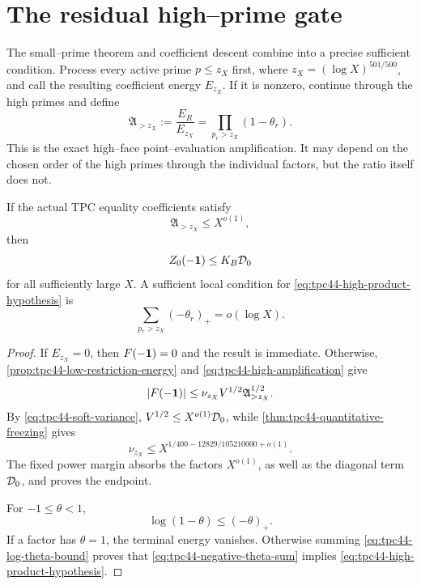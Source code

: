 \section{The residual high--prime gate}
\label{sec:tpc44-next-gate}

The small--prime theorem and coefficient descent combine into a precise
sufficient condition.  Process every active prime \(p\le z_X\) first,
where \(z_X=(\log X)^{501/500}\), and call the resulting coefficient
energy \(E_{z_X}\).  If it is nonzero, continue through the high primes
and define
\begin{equation}
 \mathfrak A_{>z_X}
 :=\frac{E_R}{E_{z_X}}
 =\prod_{p_r>z_X}(1-\theta_r).
 \label{eq:tpc44-high-amplification}
\end{equation}
This is the exact high--face point--evaluation amplification.  It may
depend on the chosen order of the high primes through the individual
factors, but the ratio itself does not.

\begin{theorem}
\label{thm:tpc44-high-gate}
If the actual TPC equality coefficients satisfy
\begin{equation}
 \mathfrak A_{>z_X}\le X^{o(1)},
 \label{eq:tpc44-high-product-hypothesis}
\end{equation}
then
\begin{equation}
 Z_0(-\mathbf 1)\le K_B\mathcal D_0
 \label{eq:tpc44-conditional-endpoint}
\end{equation}
for all sufficiently large \(X\).  A sufficient local condition for
\eqref{eq:tpc44-high-product-hypothesis} is
\begin{equation}
 \sum_{p_r>z_X}(-\theta_r)_+=o(\log X).
 \label{eq:tpc44-negative-theta-sum}
\end{equation}
\end{theorem}

\begin{proof}
If \(E_{z_X}=0\), then \(F(-\mathbf 1)=0\) and the result is immediate.
Otherwise, \cref{prop:tpc44-low-restriction-energy} and
\eqref{eq:tpc44-high-amplification} give
\begin{equation}
 |F(-\mathbf 1)|
 \le\nu_{z_X}V^{1/2}\mathfrak A_{>z_X}^{1/2}.
 \label{eq:tpc44-final-F-bound}
\end{equation}
By \eqref{eq:tpc44-soft-variance},
\(
 V^{1/2}\le X^{o(1)}\mathcal D_0
\), while
\cref{thm:tpc44-quantitative-freezing} gives
\begin{equation}
 \nu_{z_X}\le
 X^{1/400-12829/105210000+o(1)}.
 \label{eq:tpc44-nu-with-margin}
\end{equation}
The fixed power margin absorbs the factors \(X^{o(1)}\), as well as the
diagonal term \(\mathcal D_0\), and proves the endpoint.

For \(-1\le\theta<1\),
\begin{equation}
 \log(1-\theta)\le(-\theta)_+.
 \label{eq:tpc44-log-theta-bound}
\end{equation}
If a factor has \(\theta=1\), the terminal energy vanishes.  Otherwise
summing \eqref{eq:tpc44-log-theta-bound} proves that
\eqref{eq:tpc44-negative-theta-sum} implies
\eqref{eq:tpc44-high-product-hypothesis}.
\end{proof}

